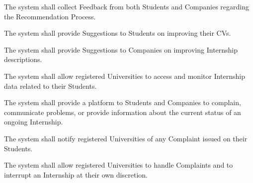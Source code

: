 \begin{enumerate}[label={\color{titleColor}[R\arabic*]}]
    \item The system shall collect Feedback from both Students and Companies regarding the Recommendation Process.
    \item The system shall provide Suggestions to Students on improving their CVs.
    \item The system shall provide Suggestions to Companies on improving Internship descriptions.

    \item The system shall allow registered Universities to access and monitor Internship data related to their Students.
    \item The system shall provide a platform to Students and Companies to complain, communicate problems, or provide information about the current status of an ongoing Internship.
    \item The system shall notify registered Universities of any Complaint issued on their Students.
    \item The system shall allow registered Universities to handle Complaints and to interrupt an Internship at their own discretion.
\end{enumerate}

